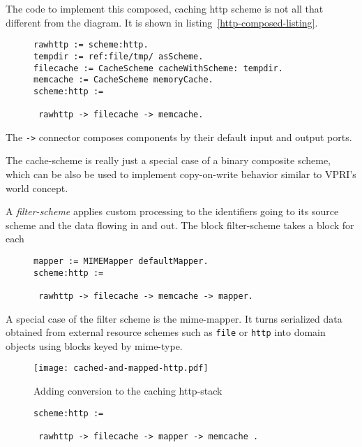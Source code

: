 \documentclass[preprint,authoryear]{acm_proc_article-sp}
\begin{document}
The code to implement this composed, caching http scheme is not all 
that different from the diagram.  It is shown in listing~\ref{http-composed-listing}.

\begin{figure}[htbp]
\begin{lstlisting}[style=L,label=http-composed-listing,caption=Code for caching http stack.]
rawhttp := scheme:http.
tempdir := ref:file/tmp/ asScheme.
filecache := CacheScheme cacheWithScheme: tempdir.
memcache := CacheScheme memoryCache.
scheme:http := 

 rawhttp -> filecache -> memcache.
\end{lstlisting}
\end{figure}

The {\tt ->} connector composes components by their default input
and output ports.

The cache-scheme is really just a special case of a binary composite scheme,
which can be also be used to implement copy-on-write behavior similar to
VPRI's world concept\cite{vpriworlds}.

A {\em filter-scheme} applies custom processing to the identifiers going to
its source scheme and the data flowing in and out.  The block filter-scheme
takes a block for each 

\begin{figure}[htbp]
\begin{lstlisting}[style=L,label=http-cached-converted-listing,caption=Caching and converting.]
mapper := MIMEMapper defaultMapper.
scheme:http := 

 rawhttp -> filecache -> memcache -> mapper.
\end{lstlisting}
\end{figure}


 A special case of the 
filter scheme is the mime-mapper.  It turns serialized data obtained from
external resource schemes such as {\tt file} or {\tt http} into domain objects
using blocks keyed by mime-type.  

\begin{figure}[htbp]
\caption{Adding conversion to the caching http-stack}
\label{http-cached-converted}
\begin{center}
\texttt{[image: cached-and-mapped-http.pdf]}
\end{center}
\end{figure}

\begin{figure}[htbp]
\begin{lstlisting}[style=L,label=http-cached-converted-listing,caption=Converting and caching.]
scheme:http := 

 rawhttp -> filecache -> mapper -> memcache .
\end{lstlisting}
\end{figure}
\end{document}
